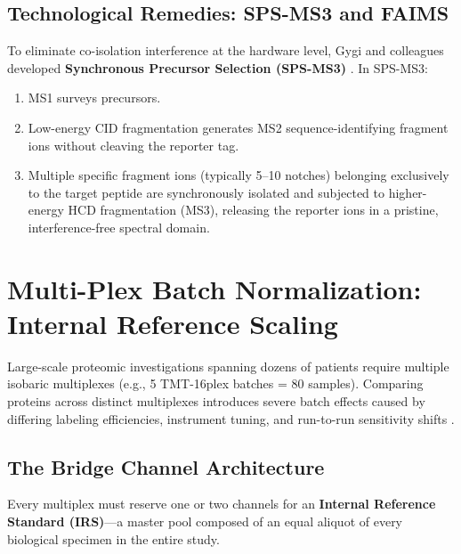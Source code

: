 \documentclass[11pt,oneside]{book}
\begin{document}
\subsection{Technological Remedies: SPS-MS3 and FAIMS}
To eliminate co-isolation interference at the hardware level, Gygi and colleagues developed \textbf{Synchronous Precursor Selection (SPS-MS3)} \cite{ting2011sps,mcalister2014multinotch}. In SPS-MS3:
\begin{enumerate}
    \item MS1 surveys precursors.
    \item Low-energy CID fragmentation generates MS2 sequence-identifying fragment ions without cleaving the reporter tag.
    \item Multiple specific fragment ions (typically 5--10 notches) belonging exclusively to the target peptide are synchronously isolated and subjected to higher-energy HCD fragmentation (MS3), releasing the reporter ions in a pristine, interference-free spectral domain.
\end{enumerate}

\section{Multi-Plex Batch Normalization: Internal Reference Scaling}

Large-scale proteomic investigations spanning dozens of patients require multiple isobaric multiplexes (e.g., 5 TMT-16plex batches = 80 samples). Comparing proteins across distinct multiplexes introduces severe batch effects caused by differing labeling efficiencies, instrument tuning, and run-to-run sensitivity shifts \cite{plubell2017extended}.

\subsection{The Bridge Channel Architecture}
Every multiplex must reserve one or two channels for an \textbf{Internal Reference Standard (IRS)}---a master pool composed of an equal aliquot of every biological specimen in the entire study. 
\end{document}
